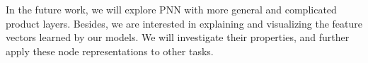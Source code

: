 \documentclass[conference]{IEEEtran}
\begin{document}
In the future work, we will explore PNN with more general and complicated product layers. Besides, we are interested in explaining and visualizing the feature vectors learned by our models. We will investigate their properties, and further apply these node representations to other tasks.






\end{document}
